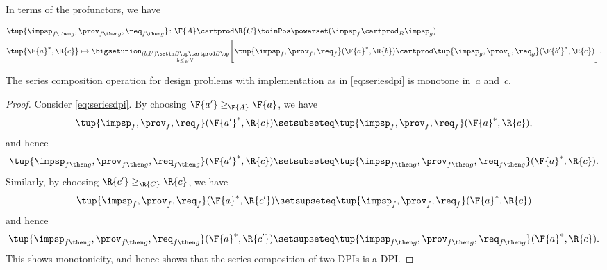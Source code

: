 {\begin{definition}
        In terms of the profunctors, we have
        \begin{widepar}
            \begin{equation}
                \label{eq:seriesdpi}
                \begin{aligned}
                     & \tup{\impsp_{f\then g},\prov_{f\then g},\req_{f\then g}}\colon \F{A}\cartprod \R{C} \toinPos \powerset(\impsp_f \cartprod_B \impsp_g) \\
                     & \tup{\F{a}^*,\R{c}} \mapsto \bigsetunion_{\substack{(b,b') \setin B\op \cartprod B\op \\ b \leq_B b'}} \Bigg[ \tup{\impsp_f,\prov_f,\req_f}(\F{a}^*,\R{b}) \cartprod \tup{\impsp_g,\prov_g,\req_g}(\F{b'}^*,\R{c}) \Bigg].
                \end{aligned}
            \end{equation}
        \end{widepar}
    \end{definition}

    \begin{lemma}
        The series composition operation for design problems with implementation as in \cref{eq:seriesdpi} is monotone in~$a$ and~$c$.
    \end{lemma}
    \begin{proof}
        Consider \cref{eq:seriesdpi}.
        By choosing $\F{a'}\geq_\F{A} \F{a}$, we have
        \begin{equation}
            \tup{\impsp_{f},\prov_{f},\req_{f}}(\F{a'}^*,\R{c})\setsubseteq \tup{\impsp_{f},\prov_{f},\req_{f}}(\F{a}^*,\R{c}),
        \end{equation}
        and hence
        \begin{equation}
            \tup{\impsp_{f\then g},\prov_{f\then g},\req_{f\then g}}(\F{a'}^*,\R{c})\setsubseteq \tup{\impsp_{f\then g},\prov_{f\then g},\req_{f\then g}}(\F{a}^*,\R{c}).
        \end{equation}
        Similarly, by choosing $\R{c'}\geq_{\R{C}} \R{c}$, we have
        \begin{equation}
            \tup{\impsp_{f},\prov_{f},\req_{f}}(\F{a}^*,\R{c'})\setsupseteq \tup{\impsp_{f},\prov_{f},\req_{f}}(\F{a}^*,\R{c})
        \end{equation}
        and hence
        \begin{equation}
            \tup{\impsp_{f\then g},\prov_{f\then g},\req_{f\then g}}(\F{a}^*,\R{c'})\setsupseteq \tup{\impsp_{f\then g},\prov_{f\then g},\req_{f\then g}}(\F{a}^*,\R{c}).
        \end{equation}
        This shows monotonicity, and hence shows that the series composition of two DPIs is a DPI.
    \end{proof}

}
